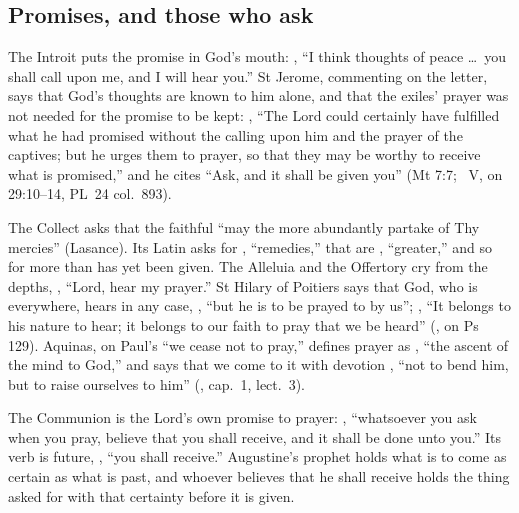 \subsection{Promises, and those who ask}
\label{sec:words-introit}

The Introit puts the promise in God's mouth: , ``I think thoughts of peace
\dots\ you shall call upon me, and I will hear you.'' St Jerome, commenting on
the letter, says that God's thoughts are known to him alone, and that the
exiles' prayer was not needed for the promise to be kept: , ``The
Lord could certainly have fulfilled what he had promised without the calling
upon him and the prayer of the captives; but he urges them to prayer, so that
they may be worthy to receive what is promised,'' and he cites ``Ask, and it
shall be given you'' (Mt 7:7; ~V, on 29:10--14, PL~24
col.~893).

The Collect asks that the faithful ``may the more abundantly partake of Thy
mercies'' (Lasance). Its Latin asks for , ``remedies,'' that are
, ``greater,'' and so for more than has yet been given. The
Alleluia and the Offertory cry from the depths,
, ``Lord, hear my prayer.'' St Hilary of
Poitiers says that God, who is everywhere, hears in
any case, , ``but he is to be prayed to by
us''; , ``It belongs to his nature to hear; it belongs to our faith to pray
that we be heard'' (, on Ps 129). Aquinas, on
Paul's ``we cease not to pray,'' defines prayer as , ``the ascent of the mind to God,'' and says that we come to it with
devotion , ``not to
bend him, but to raise ourselves to him'' (, cap.~1,
lect.~3).

The Communion is the Lord's own promise to prayer: , ``whatsoever you ask when
you pray, believe that you shall receive, and it shall be done unto you.''
Its verb is future, , ``you shall receive.'' Augustine's
prophet holds what is to come as certain as what is past, and whoever believes
that he shall receive holds the thing asked for with that certainty before it
is given.

